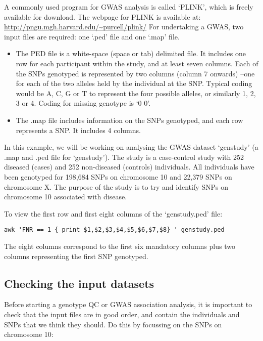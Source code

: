 \documentclass[]{book}
\providecommand{\tightlist}{%
  \setlength{\itemsep}{0pt}\setlength{\parskip}{0pt}}
\begin{document}
A commonly used program for GWAS analysis is called `PLINK', which is
freely available for download. The webpage for PLINK is available at:
\url{http://pngu.mgh.harvard.edu/~purcell/plink/} For undertaking a
GWAS, two input files are required: one `.ped' file and one `.map' file.

\begin{itemize}
\tightlist
\item
  The PED file is a white-space (space or tab) delimited file. It
  includes one row for each participant within the study, and at least
  seven columns. Each of the SNPs genotyped is represented by two
  columns (column 7 onwards) --one for each of the two alleles held by
  the individual at the SNP. Typical coding would be A, C, G or T to
  represent the four possible alleles, or similarly 1, 2, 3 or 4. Coding
  for missing genotype is `0 0'.
\item
  The .map file includes information on the SNPs genotyped, and each row
  represents a SNP. It includes 4 columns.
\end{itemize}

In this example, we will be working on analysing the GWAS dataset
`genstudy' (a .map and .ped file for `genstudy'). The study is a
case-control study with 252 diseased (cases) and 252 non-diseased
(controls) individuals. All individuals have been genotyped for 198,684
SNPs on chromosome 10 and 22,379 SNPs on chromosome X. The purpose of
the study is to try and identify SNPs on chromosome 10 associated with
disease.

To view the first row and first eight columns of the `genstudy.ped'
file:

\begin{verbatim}
awk 'FNR == 1 { print $1,$2,$3,$4,$5,$6,$7,$8} ' genstudy.ped
\end{verbatim}

The eight columns correspond to the first six mandatory columns plus two
columns representing the first SNP genotyped.

\subsection{Checking the input
datasets}\label{checking-the-input-datasets}

Before starting a genotype QC or GWAS association analysis, it is
important to check that the input files are in good order, and contain
the individuals and SNPs that we think they should. Do this by focussing
on the SNPs on chromosome 10:
\end{document}
